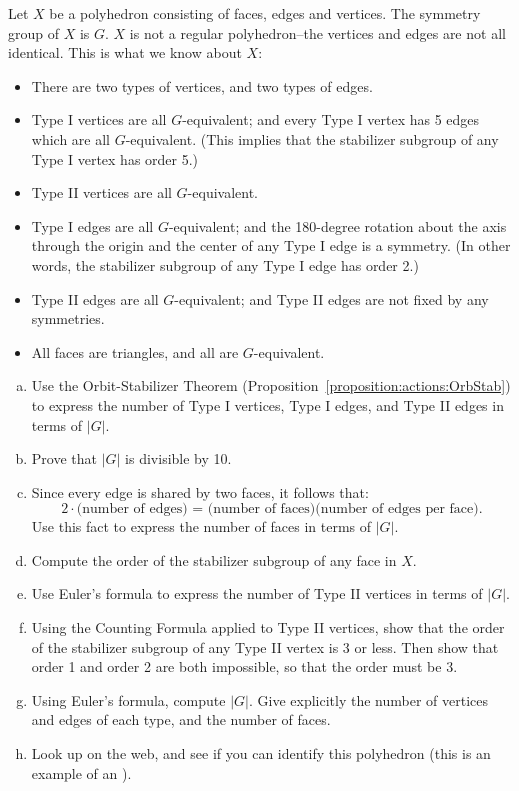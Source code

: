 \begin{exercise}\label{exercise:actions:FunFact}
Let $X$ be a polyhedron consisting of faces, edges and vertices. The symmetry group of $X$ is $G$. $X$ is not a regular polyhedron--the vertices and edges are not all identical.  This is what we know about $X$:
\begin{itemize}
\item
There are two types of vertices, and two types of edges. 
\item Type I vertices are all $G$-equivalent; and every Type I vertex has 5 edges which are all $G$-equivalent. (This implies that the stabilizer subgroup of any Type I vertex has order 5.)
\item Type II vertices are all $G$-equivalent.
\item Type I edges are all $G$-equivalent; and the 180-degree rotation about the axis through the origin and the center of any Type I edge is a symmetry. (In other words, the stabilizer subgroup  of any Type I edge has order 2.)
\item Type II edges are all $G$-equivalent; and Type II edges are not fixed by any symmetries.
\item All faces are triangles, and all are $G$-equivalent.
\end{itemize}
\begin{enumerate}[(a)]
\item 
Use the Orbit-Stabilizer Theorem  (Proposition~\ref{proposition:actions:OrbStab}) to express the number of Type I vertices, Type I  edges, and Type II edges in terms of $|G|$.
\item 
Prove that $|G|$ is divisible by 10.
\item
Since every edge is shared by two faces, it follows that:
\[ 2 \cdot \text{(number of edges) = (number of faces)(number of edges per face)}.\]
Use this fact to express the number of faces in terms of $|G|$.
\item
Compute the order of the stabilizer subgroup of any face in $X$.
\item
Use Euler's formula to express the number of Type II vertices in terms of $|G|$.
\item
Using the Counting Formula applied to Type II vertices, show that the order of the stabilizer subgroup of any Type II vertex is 3 or less. Then show that  order 1 and order 2 are both impossible, so that the order must be 3.
\item
Using Euler's formula, compute $|G|$. Give explicitly the number of vertices and edges of each type, and the number of faces.
\item
Look up on the web, and see if you can identify this polyhedron (this is an example of an ).
\end{enumerate}
\end{exercise}

